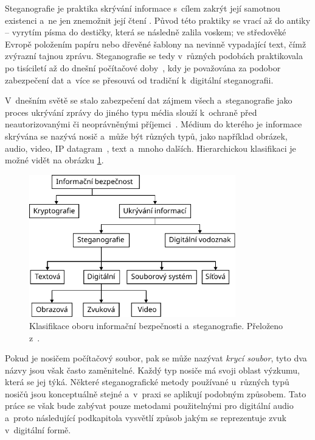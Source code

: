 Steganografie je praktika skrývání informace s~cílem zakrýt její samotnou
existenci a~ne jen znemožnit její čtení
\cite{AlSabhany2020}\cite{Anderson1998}\cite{Djebbar2012}\cite{Dutta2020}.
Původ této praktiky se vrací až do antiky -- vyrytím písma do destičky, která
se následně zalila voskem; ve středověké Evropě položením papíru nebo dřevěné
šablony na nevinně vypadající text, čímž zvýrazní tajnou zprávu. Steganografie
se tedy v~různých podobách praktikovala po tisíciletí až do dnešní počítačové
doby~\cite{Anderson1998}, kdy je považována za podobor zabezpečení dat
\cite{Djebbar2012} a~více se přesouvá od tradiční k~digitální steganografii.

V~dnešním světě se stalo zabezpečení dat zájmem všech a~steganografie jako
proces ukrývání zprávy do jiného typu média slouží k~ochraně před
neautorizovanými či neoprávněnými příjemci~\cite{Dutta2020}. Médium do kterého
je informace skrývána se nazývá nosič a~může být různých typů, jako například
obrázek, audio, video, IP datagram~\cite{Dutta2020}, text a~mnoho dalších.
Hierarchickou klasifikaci je možné vidět na obrázku
\ref{pic:steganography-classification}.

\begin{figure}[hbt]
    \centering
    \includegraphics[width=0.8\textwidth]{obrazky/steganography-classification.pdf}
    \caption{Klasifikace oboru informační bezpečnosti a~steganografie.
    Přeloženo z~\cite{Elshoush2022}.}
    \label{pic:steganography-classification}
\end{figure}

Pokud je nosičem počítačový soubor, pak se může nazývat \textit{krycí soubor},
tyto dva názvy jsou však často zaměnitelné. Každý typ nosiče má svoji oblast
výzkumu, která se jej týká. Některé steganografické metody používané u~různých
typů nosičů jsou konceptuálně stejné a~v~praxi se aplikují podobným způsobem.
Tato práce se však bude zabývat pouze metodami použitelnými pro digitální
audio a~proto následující podkapitola vysvětlí způsob jakým se reprezentuje
zvuk v~digitální formě.

